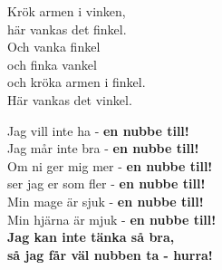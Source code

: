 \documentclass[a6paper, 10pt, twoside]{article}
\begin{document}
\newpage
\noindent
\begin{center}
\end{center}
\begin{lyrics}
Krök armen i vinken, \\
här vankas det finkel. \\
Och vanka finkel \\
och finka vankel \\
och kröka armen i finkel. \\
Här vankas det vinkel. 
\end{lyrics}
\begin{center}
    \vspace{40pt}
\end{center}
\begin{lyrics}
Jag vill inte ha - \textbf{en nubbe till!}\\
Jag mår inte bra - \textbf{en nubbe till!}\\
Om ni ger mig mer - \textbf{en nubbe till!}\\
ser jag er som fler - \textbf{en nubbe till!}\\
\vspace{5pt}
Min mage är sjuk - \textbf{en nubbe till!}\\
Min hjärna är mjuk - \textbf{en nubbe till!}\\
\textbf{Jag kan inte tänka så bra,\\
så jag får väl nubben ta - hurra!}\\
\end{lyrics}
\end{document}

